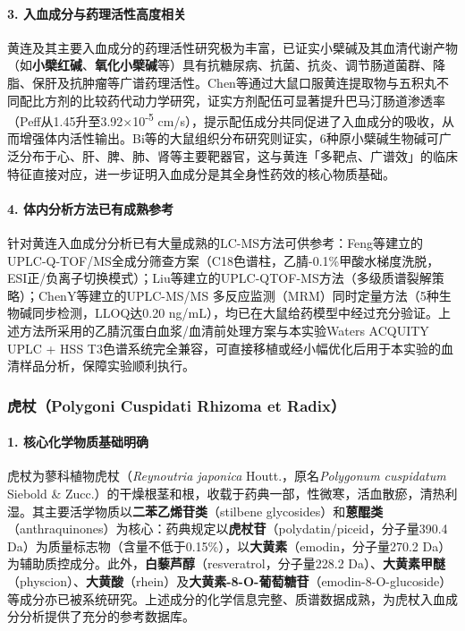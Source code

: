 \documentclass[12pt,a4paper,UTF8,scheme=chinese]{ctexart}
\newcommand{\compoundname}[1]{\textbf{#1}}
\newcommand{\herbname}[1]{\textit{#1}}
\begin{document}
\paragraph{3. 入血成分与药理活性高度相关}

黄连及其主要入血成分的药理活性研究极为丰富，已证实小檗碱及其血清代谢产物（如\compoundname{小檗红碱}、\compoundname{氧化小檗碱}等）具有抗糖尿病、抗菌、抗炎、调节肠道菌群、降脂、保肝及抗肿瘤等广谱药理活性。Chen等\cite{ChenY2015}通过大鼠口服黄连提取物与五积丸不同配比方剂的比较药代动力学研究，证实方剂配伍可显著提升巴马汀肠道渗透率（Peff从1.45升至3.92×10\textsuperscript{-5} cm/s），提示配伍成分共同促进了入血成分的吸收，从而增强体内活性输出。Bi等\cite{Bi2016}的大鼠组织分布研究则证实，6种原小檗碱生物碱可广泛分布于心、肝、脾、肺、肾等主要靶器官，这与黄连「多靶点、广谱效」的临床特征直接对应，进一步证明入血成分是其全身性药效的核心物质基础。

\paragraph{4. 体内分析方法已有成熟参考}

针对黄连入血成分分析已有大量成熟的LC-MS方法可供参考：Feng等\cite{FengX2020}建立的UPLC-Q-TOF/MS全成分筛查方案（C18色谱柱，乙腈-0.1\%甲酸水梯度洗脱，ESI正/负离子切换模式）；Liu等\cite{LiuYi2020}建立的UPLC-QTOF-MS方法（多级质谱裂解策略）；ChenY等\cite{ChenY2015}建立的UPLC-MS/MS 多反应监测（MRM）同时定量方法（5种生物碱同步检测，LLOQ达0.20 ng/mL），均已在大鼠给药模型中经过充分验证。上述方法所采用的乙腈沉蛋白血浆/血清前处理方案与本实验Waters ACQUITY UPLC + HSS T3色谱系统完全兼容，可直接移植或经小幅优化后用于本实验的血清样品分析，保障实验顺利执行。

\subsubsection{虎杖（Polygoni Cuspidati Rhizoma et Radix）}

\paragraph{1. 核心化学物质基础明确}

虎杖为蓼科植物虎杖（\herbname{Reynoutria japonica} Houtt.，原名\herbname{Polygonum cuspidatum} Siebold \& Zucc.）的干燥根茎和根，收载于药典一部，性微寒，活血散瘀，清热利湿。其主要活学物质以\textbf{二苯乙烯苷类}（stilbene glycosides）和\textbf{蒽醌类}（anthraquinones）为核心：药典规定以\compoundname{虎杖苷}（polydatin/piceid，分子量390.4 Da）为质量标志物（含量不低于0.15\%），以\compoundname{大黄素}（emodin，分子量270.2 Da）为辅助质控成分。此外，\compoundname{白藜芦醇}（resveratrol，分子量228.2 Da）、\compoundname{大黄素甲醚}（physcion）、\compoundname{大黄酸}（rhein）及\compoundname{大黄素-8-O-葡萄糖苷}（emodin-8-O-glucoside）等成分亦已被系统研究\cite{ZhangY2023}。上述成分的化学信息完整、质谱数据成熟，为虎杖入血成分分析提供了充分的参考数据库。
\end{document}
